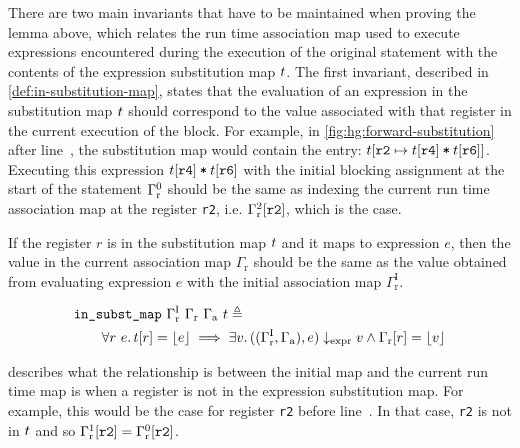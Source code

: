 There are two main invariants that have to be maintained when proving the lemma
above, which relates the run time association map used to execute expressions
encountered during the execution of the original statement with the contents of
the expression substitution map $t$.  The first invariant, described in
\cref{def:in-substitution-map}, states that the evaluation of an expression in
the substitution map $t$ should correspond to the value associated with
that register in the current execution of the block.  For example, in
\cref{fig:hg:forward-substitution} after line~, the substitution
map would contain the entry:
$t\!\left[\texttt{r2} \mapsto t\!\left[\texttt{r4}\right]
  \mathbin{\texttt{*}} t\!\left[\texttt{r6}\right]\right]$.  Executing this expression
$t\!\left[\texttt{r4}\right] \mathbin{\texttt{*}} t\!\left[\texttt{r6}\right]$
with the initial blocking assignment at the start of the statement
${\Gamma}^{0}_{\mathrm r}$ should be the same as indexing the current
run time association map at the register \texttt{r2},
i.e. ${\Gamma}^{2}_{\mathrm r}\!\left[\texttt{r2}\right]$, which is the case.

\begin{definition}%
  \label{def:in-substitution-map}

  If the register $r$ is in the substitution map $t$ and it maps to
  expression $e$, then the value in the current association map
  $\Gamma_{\mathrm r}$ should be the same as the value obtained from evaluating
  expression $e$ with the initial association map
  $\Gamma^{\mathrm{I}}_{\mathrm r}$.

  \begin{equation*}
    \begin{aligned}
      &\texttt{in\_subst\_map}\ \Gamma^{\mathrm{I}}_{\mathrm r}\ \Gamma_{\mathrm r}\ \Gamma_{\mathrm a}\ t \triangleq \\
      &\qquad \forall r\ e\ldotp t\!\left[r\right] = \lfloor e \rfloor \implies \exists v\ldotp
      ((\Gamma^{\mathrm{I}}_{\mathrm r}, \Gamma_{\mathrm a}), e) \downarrow_{\text{expr}} v
      \land \Gamma_{\mathrm r}\!\left[r\right] = \lfloor v \rfloor
    \end{aligned}
  \end{equation*}
\end{definition}

 describes what the relationship is between
the initial map and the current run time map is when a register is not in the
expression substitution map.  For example, this would be the case for register
\texttt{r2} before line~.  In that case, \texttt{r2} is not in
$t$ and so
${\Gamma}^{1}_{\mathrm r}\!\left[\texttt{r2}\right] =
{\Gamma}^{0}_{\mathrm r}\!\left[\texttt{r2}\right]$.

